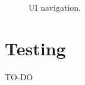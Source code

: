 \begin{figure}[H]
	\begin{center}
	\end{center}
	\caption{UI navigation.}\label{fig:userNavigation}
\end{figure}

\section{Testing}
TO-DO











